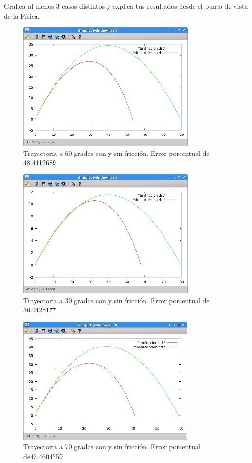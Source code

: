 \documentclass[12pt]{article}
\begin{document}
 Grafica al menos 3 casos distintos y explica tus resultados desde el punto de vista de la Física.\\
 
  
 \begin{figure}[H]
 \centering
 \includegraphics{producto660}
 \caption{Trayectoria a 60 grados con y sin fricción. Error porcentual de 48.4412689 }
 \end{figure}
 
 
 \begin{figure}[H]
 \centering
  \includegraphics{producto630}
   \caption{Trayectoria a 30 grados con y sin fricción. Error porcentual de 36.9428177 }
  \end{figure}
  
  \begin{figure}[H]
 \centering
 \includegraphics{producto670} 
  \caption{Trayectoria a 70 grados con y sin fricción. Error porcentual de43.4604759}
 \end{figure}
 
\end{document}
